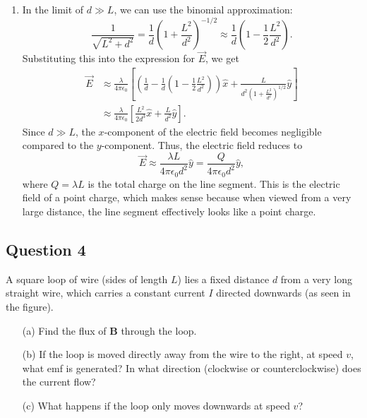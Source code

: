 \documentclass{article}
\begin{document}
\begin{enumerate}
\item In the limit of \(d \gg L\), we can use the binomial approximation:
\begin{equation*}
\frac{1}{\sqrt{L^2 + d^2}} = \frac{1}{d} \left( 1 + \frac{L^2}{d^2} \right)^{-1/2} \approx \frac{1}{d} \left( 1 - \frac{1}{2} \frac{L^2}{d^2} \right).
\end{equation*}
Substituting this into the expression for \(\vec{E}\), we get
\begin{align*}
\vec{E} &\approx \frac{\lambda}{4\pi\epsilon_0} \left[ \left( \frac{1}{d} - \frac{1}{d} \left( 1 - \frac{1}{2} \frac{L^2}{d^2} \right) \right) \hat{x} + \frac{L}{d^2 \left( 1 + \frac{L^2}{d^2} \right)^{1/2}} \hat{y} \right] \\
&\approx \frac{\lambda}{4\pi\epsilon_0} \left[ \frac{L^2}{2d^3} \hat{x} + \frac{L}{d^2} \hat{y} \right].
\end{align*}
Since \(d \gg L\), the \(x\)-component of the electric field becomes negligible compared to the \(y\)-component. Thus, the electric field reduces to
\begin{equation*}
\vec{E} \approx \frac{\lambda L}{4\pi\epsilon_0 d^2} \hat{y} = \frac{Q}{4\pi\epsilon_0 d^2} \hat{y},
\end{equation*}
where \(Q = \lambda L\) is the total charge on the line segment. This is the electric field of a point charge, which makes sense because when viewed from a very large distance, the line segment effectively looks like a point charge.
\end{enumerate}


\subsection{Question 4}
A square loop of wire (sides of length $L$) lies a fixed distance $d$ from a very long straight wire, which carries a constant current $I$ directed downwards (as seen in the figure).

\begin{enumerate}
    \item[(a)] Find the flux of $\mathbf{B}$ through the loop.
    \item[(b)] If the loop is moved directly away from the wire to the right, at speed $v$, what emf is generated? In what direction (clockwise or counterclockwise) does the current flow?
    \item[(c)] What happens if the loop only moves downwards at speed $v$?
\end{enumerate}
\end{document}
